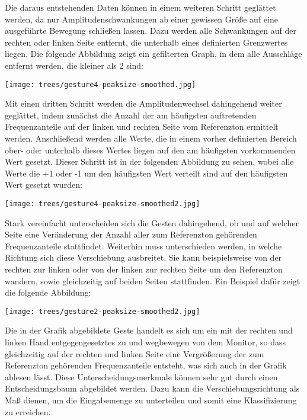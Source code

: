 Die daraus entstehenden Daten können in einem weiteren Schritt geglättet werden, da nur Amplitudenschwankungen ab einer gewissen 
Größe auf eine ausgeführte Bewegung schließen lassen. Dazu werden alle Schwankungen auf der rechten oder linken Seite entfernt, 
die unterhalb eines definierten Grenzwertes liegen. 
Die folgende Abbildung zeigt ein gefilterten Graph, in dem alle Ausschläge entfernt werden, die kleiner als 2 sind:

\begin{center}
  \texttt{[image: trees/gesture4-peaksize-smoothed.jpg]}
\end{center}

Mit einen dritten Schritt werden die Amplitudenwechsel dahingehend weiter geglättet, indem zunächst die Anzahl der am häufigsten 
auftretenden Frequenzanteile auf der linken und rechten Seite vom Referenzton ermittelt werden. Anschließend werden alle Werte,
die in einem vorher definierten Bereich ober- oder unterhalb dieses Wertes liegen auf den am häufigsten vorkommenden Wert gesetzt.
Dieser Schritt ist in der folgenden Abbildung zu sehen, wobei alle Werte die +1 oder -1 um den häufigsten Wert verteilt sind 
auf den häufigsten Wert gesetzt wurden:

\begin{center}
  \texttt{[image: trees/gesture4-peaksize-smoothed2.jpg]}
\end{center}


Stark vereinfacht unterscheiden sich die Gesten dahingehend, ob und auf welcher Seite 
eine Veränderung der Anzahl aller zum Referenzton gehörenden Frequenzanteile stattfindet. 
Weiterhin muss unterschieden werden, in welche Richtung sich diese Verschiebung ausbreitet. 
Sie kann beispielsweise von der rechten zur linken oder von der linken zur rechten Seite 
um den Referenzton wandern, sowie gleichzeitig auf beiden Seiten stattfinden. 
Ein Beispiel dafür zeigt die folgende Abbildung:

\begin{center} 
\label{fig:contrary}
  \texttt{[image: trees/gesture2-peaksize-smoothed2.jpg]}
\end{center}

Die in der Grafik abgebildete Geste handelt es sich um ein mit der rechten und linken Hand entgegengesetztes zu und 
wegbewegen von dem Monitor, so dass gleichzeitig auf der rechten und linken Seite eine Vergrößerung der 
zum Referenzton gehörenden Frequenzanteile entsteht, was sich auch in der Grafik ablesen lässt.
Diese Unterscheidungsmerkmale können sehr gut durch einen Entscheidungsbaum abgebildet werden. 
Dazu kann die Verschiebungsrichtung als Maß dienen, um die Eingabemenge zu unterteilen und 
somit eine Klassifizierung zu erreichen.

